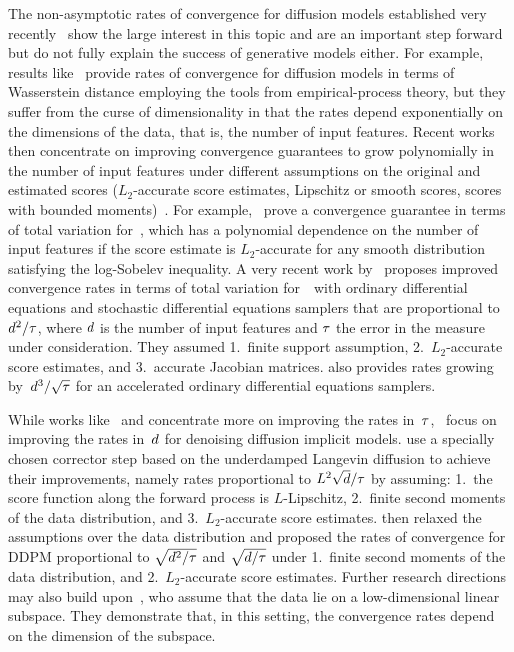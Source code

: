 
The non-asymptotic rates of convergence for diffusion models established very recently~\citep{block2020generative,de2021diffusion,de2022convergence,lee2022convergence,chen2023probability,chen2023improved,li2023towards,chen2023restoration,huang2024convergence} show the large interest in this topic and are an important step forward but do not fully explain the success of generative models either.
For example, results like~\citet[Theorem~13]{block2020generative} provide rates of convergence for diffusion models in terms of Wasserstein distance employing the tools from empirical-process theory, 
but they suffer from the curse of dimensionality in that the rates depend exponentially on the dimensions of the data, that is, the number of input features. 
Recent works then concentrate on improving convergence guarantees to grow polynomially in the number of input features under different assumptions on the  original and estimated scores ($L_2$-accurate score estimates, Lipschitz or smooth scores, scores with bounded moments)~\citep{lee2022convergence,wibisono2022convergence,chen2022sampling,chen2023probability,chen2023improved,chen2023restoration,lee2023convergence,huang2024convergence}. 
 For example,~\citet{lee2022convergence} prove a convergence guarantee  in terms of total variation for~\sgm, 
 which has a polynomial dependence on the number of input features if the score estimate is $L_2$-accurate for any smooth distribution satisfying the log-Sobelev inequality.
A very recent work by~\citet{li2023towards} proposes improved convergence rates in terms of total variation for~\ddpm~with ordinary differential equations and stochastic differential equations samplers that are proportional to $\textcolor{black}{d}^2/\textcolor{black}{\tau}$,
where $\textcolor{black}{d}$ is the number of input features and $\textcolor{black}{\tau}$ the error in the measure under consideration.
They assumed 1.~finite support  assumption, 2.~$L_2$-accurate score estimates, and 3.~accurate Jacobian matrices. 
\citet[Theorem~3]{li2023towards} also provides rates growing by~$\textcolor{black}{d}^3/\sqrt{\textcolor{black}{\tau}}$ for an accelerated ordinary differential equations samplers. 

While works like~\citet{li2023towards} and \citet{li2024accelerating} concentrate more on improving the rates in~$\textcolor{black}{\tau}$,~\citet{chen2023probability} focus on improving the rates in~$\textcolor{black}{d}$ for denoising diffusion implicit models.
\citet{chen2023probability} use a specially chosen corrector step based on the underdamped Langevin diffusion to achieve their improvements, namely rates  proportional to $L^2\sqrt{\textcolor{black}{d}}/\textcolor{black}{\tau}$
by assuming: 1.~the score function along the forward process is $L$-Lipschitz,  2.~finite second moments of the data distribution, and  3.~$L_2$-accurate score estimates. 
\citet{chen2023improved,benton2023linear} then  relaxed the assumptions over the data distribution and  proposed  the  rates of convergence for DDPM  proportional to $\sqrt{\textcolor{black}{d}^2/\tau}$ and $\sqrt{\textcolor{black}{d}/\tau}$ under 1.~finite second moments of the data distribution, and  2.~$L_2$-accurate score estimates. 
Further research directions may also build upon~\citet{chen2023score}, who assume that the data lie on a low-dimensional linear subspace. They demonstrate that, in this setting, the convergence rates depend on the dimension of the subspace.

